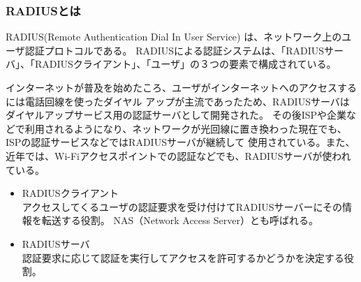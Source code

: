 \documentclass[11pt,a4j,titlepage]{jreport}
\begin{document}
\subsubsection*{RADIUSとは}
RADIUS(Remote Authentication Dial In User Service) \cite{RFC2865}は、ネットワーク上のユーザ認証プロトコルである。
RADIUSによる認証システムは、「RADIUSサーバ」、「RADIUSクライアント」、「ユーザ」の３つの要素で構成されている。

インターネットが普及を始めたころ、ユーザがインターネットへのアクセスするには電話回線を使ったダイヤル
アップが主流であったため、RADIUSサーバはダイヤルアップサービス用の認証サーバとして開発された。
その後ISPや企業などで利用されるようになり、ネットワークが光回線に置き換わった現在でも、ISPの認証サービスなどではRADIUSサーバが継続して
使用されている。また、近年では、Wi-Fiアクセスポイントでの認証などでも、RADIUSサーバが使われている。

\begin{itemize}
    \setlength{\parskip}{0.05cm} %
    \setlength{\itemsep}{0.05cm} 
    \item RADIUSクライアント\mbox{}\\
    アクセスしてくるユーザの認証要求を受け付けてRADIUSサーバーにその情報を転送する役割。
    NAS（Network Access Server）とも呼ばれる。
    \item RADIUSサーバ\mbox{}\\
    認証要求に応じて認証を実行してアクセスを許可するかどうかを決定する役割。
\end{itemize}
\end{document}
